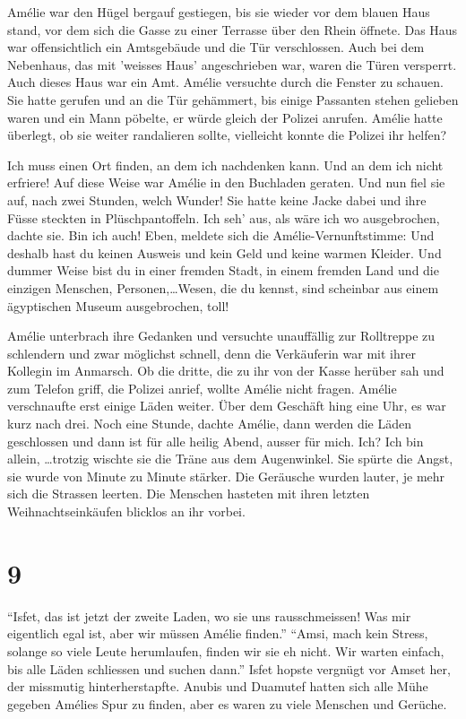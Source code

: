 \documentclass[11pt,titlepage,a5paper]{book}
\begin{document}
Amélie war den Hügel bergauf gestiegen, bis sie wieder vor dem blauen Haus stand, vor dem sich die Gasse zu einer Terrasse über den Rhein öffnete. Das Haus war offensichtlich ein Amtsgebäude und die Tür verschlossen. Auch bei dem Nebenhaus, das mit 'weisses Haus' angeschrieben war, waren die Türen versperrt. Auch dieses Haus war ein Amt. Amélie versuchte durch die Fenster zu schauen. Sie  hatte gerufen und an die Tür gehämmert, bis einige Passanten stehen gelieben waren und ein Mann pöbelte, er würde gleich der Polizei anrufen. Amélie hatte überlegt, ob sie weiter randalieren sollte, vielleicht konnte die Polizei ihr helfen? 

Ich muss einen Ort finden, an dem ich nachdenken kann. Und an dem ich nicht erfriere! Auf diese Weise war Amélie in den Buchladen geraten. Und nun fiel sie auf, nach zwei Stunden, welch Wunder! Sie hatte keine Jacke dabei und ihre Füsse steckten in Plüschpantoffeln. Ich seh' aus, als wäre ich wo ausgebrochen, dachte sie. Bin ich auch! Eben, meldete sich die Amélie-Vernunftstimme: Und deshalb hast du keinen Ausweis und kein Geld und keine warmen Kleider. Und dummer Weise bist du in einer fremden Stadt, in einem fremden Land und die einzigen Menschen, Personen,\dots Wesen, die du kennst, sind scheinbar aus einem ägyptischen Museum ausgebrochen, toll!

Amélie unterbrach ihre Gedanken und versuchte unauffällig zur Rolltreppe zu schlendern und zwar möglichst schnell, denn die Verkäuferin war mit ihrer Kollegin im Anmarsch. Ob die dritte, die zu ihr von der Kasse herüber sah und zum Telefon griff, die Polizei anrief, wollte Amélie nicht fragen. Amélie verschnaufte erst einige Läden weiter. Über dem Geschäft hing eine Uhr, es war kurz nach drei. Noch eine Stunde, dachte Amélie, dann werden die Läden geschlossen und dann ist für alle heilig Abend, ausser für mich. Ich? Ich bin allein, \dots trotzig wischte sie die Träne aus dem Augenwinkel. Sie spürte die Angst, sie wurde von Minute zu Minute stärker. Die Geräusche wurden lauter, je mehr sich die Strassen leerten. Die Menschen hasteten mit ihren letzten Weihnachtseinkäufen blicklos an ihr vorbei. 

\section*{9}


"`Isfet, das ist jetzt der zweite Laden, wo sie uns rausschmeissen! Was mir eigentlich egal ist, aber wir müssen Amélie finden."' "`Amsi, mach kein Stress, solange so viele Leute herumlaufen, finden wir sie eh nicht. Wir warten einfach, bis alle Läden schliessen und suchen dann."' Isfet hopste vergnügt vor Amset her, der missmutig hinterherstapfte. Anubis und Duamutef hatten sich alle Mühe gegeben Amélies Spur zu finden, aber es waren zu viele Menschen und Gerüche.
\end{document}
